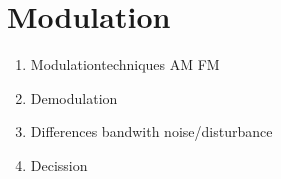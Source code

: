 \section{Modulation}\label{sec:theory:mod}

\begin{enumerate}
  \item Modulationtechniques
  \subitem AM
  \subitem FM
  \item Demodulation
  \item Differences
  \subitem bandwith
  \subitem noise/disturbance
  \item Decission
\end{enumerate}
